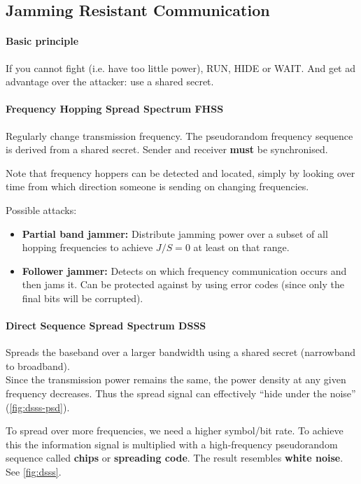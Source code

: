 \subsection{Jamming Resistant Communication}

\paragraph{Basic principle}
If you cannot fight (i.e. have too little power), RUN, HIDE or WAIT.
And get ad advantage over the attacker: use a shared secret.

\paragraph{Frequency Hopping Spread Spectrum FHSS}
Regularly change transmission frequency.
The pseudorandom frequency sequence is derived from a shared secret.
Sender and receiver \textbf{must} be synchronised.

Note that frequency hoppers can be detected and located, simply by looking over time from which direction someone is sending on changing frequencies.

Possible attacks:
\begin{itemize}
	\item \textbf{Partial band jammer:}
	Distribute jamming power over a subset of all hopping frequencies to achieve $J/S=0$ at least on that range.
	\item \textbf{Follower jammer:}
	Detects on which frequency communication occurs and then jams it.
	Can be protected against by using error codes (since only the final bits will be corrupted).
\end{itemize}

\paragraph{Direct Sequence Spread Spectrum DSSS}
Spreads the baseband over a larger bandwidth using a shared secret (narrowband to broadband). \\
Since the transmission power remains the same, the power density at any given frequency decreases.
Thus the spread signal can effectively ``hide under the noise'' (\autoref{fig:dsss-psd}).

To spread over more frequencies, we need a higher symbol/bit rate.
To achieve this the information signal is multiplied with a high-frequency pseudorandom sequence called \textbf{chips} or \textbf{spreading code}.
The result resembles \textbf{white noise}.
See \autoref{fig:dsss}.

